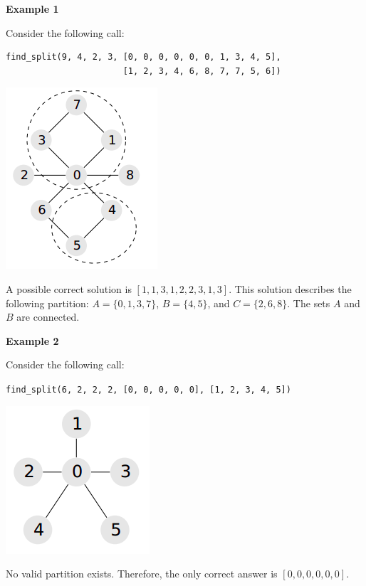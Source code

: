 \textbf{Example 1}

Consider the following call:

\begin{verbatim}
find_split(9, 4, 2, 3, [0, 0, 0, 0, 0, 0, 1, 3, 4, 5],
                       [1, 2, 3, 4, 6, 8, 7, 7, 5, 6])
\end{verbatim}

\includegraphics{1.png}

A possible correct solution is $[1, 1, 3, 1, 2, 2, 3, 1, 3]$.
This solution describes the following partition: $A=\{0, 1, 3, 7\}$, $B=\{4, 5\}$, and $C=\{2, 6, 8\}$.
The sets $A$ and $B$ are connected.

\textbf{Example 2}

Consider the following call:

\texttt{find\_split(6, 2, 2, 2, [0, 0, 0, 0, 0], [1, 2, 3, 4, 5])}

\includegraphics{2.png}

No valid partition exists. Therefore, the only correct answer is $[0, 0, 0, 0, 0, 0]$.
